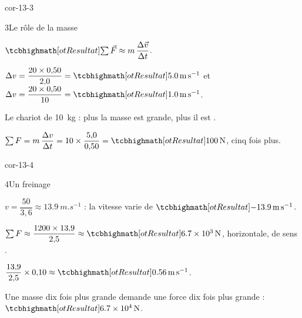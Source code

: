 \begin{blocLivre}{cor-13-3}
\begin{corrige}{3}{Le rôle de la masse}
\begin{questions}
\item $\res{\sum\vec{F}\approx m\,\dfrac{\Delta\vec{v}}{\Delta t}}$.
\item $\Delta v=\dfrac{20\times0{,}50}{2{,}0}=\res{\qty{5,0}{m.s^{-1}}}$ et $\Delta v=\dfrac{20\times0{,}50}{10}=\res{\qty{1,0}{m.s^{-1}}}$.
\item Le chariot de \qty{10}{kg} : plus la masse est grande, plus il est .
\item $\sum F=m\,\dfrac{\Delta v}{\Delta t}=10\times\dfrac{5{,}0}{0{,}50}=\res{\qty{100}{N}}$, cinq fois plus.
\end{questions}
\end{corrige}
\end{blocLivre}
\begin{blocLivre}{cor-13-4}
\begin{corrige}{4}{Un freinage}
\begin{questions}
\item $v=\dfrac{50}{3{,}6}\approx\qty{13,9}{m.s^{-1}}$ : la vitesse varie de $\res{-\qty{13,9}{m.s^{-1}}}$.
\item $\sum F\approx\dfrac{1200\times13{,}9}{2{,}5}\approx\res{\qty{6,7e3}{N}}$, horizontale, de sens .
\item $\dfrac{13{,}9}{2{,}5}\times0{,}10\approx\res{\qty{0,56}{m.s^{-1}}}$.
\item Une masse dix fois plus grande demande une force dix fois plus grande : $\res{\qty{6,7e4}{N}}$.
\end{questions}
\end{corrige}
\end{blocLivre}
